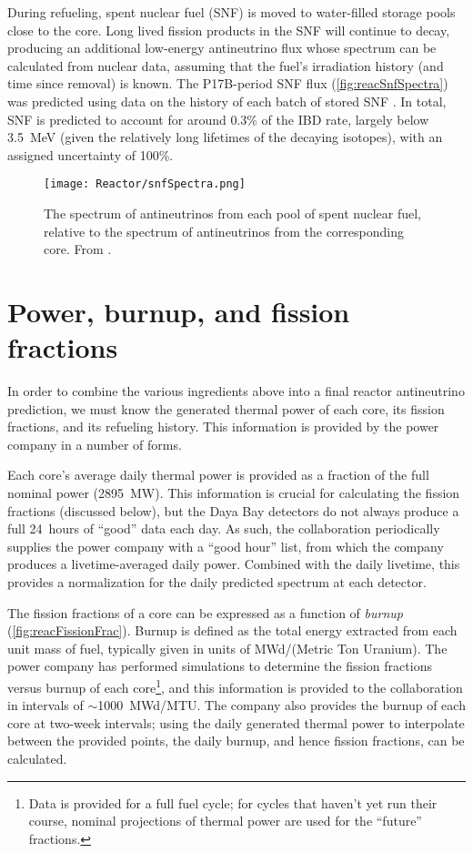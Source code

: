 \documentclass[../thesis.tex]{subfiles}
\begin{document}
During refueling, spent nuclear fuel (SNF) is moved to water-filled storage pools close to the core. Long lived fission products in the SNF will continue to decay, producing an additional low-energy antineutrino flux whose spectrum can be calculated from nuclear data, assuming that the fuel's irradiation history (and time since removal) is known. The P17B-period SNF flux (\autoref{fig:reacSnfSpectra}) was predicted using data on the history of each batch of stored SNF \cite{p17bSnf}. In total, SNF is predicted to account for around 0.3\% of the IBD rate, largely below 3.5~MeV (given the relatively long lifetimes of the decaying isotopes), with an assigned uncertainty of 100\%.

\begin{figure}[ht]
  \texttt{[image: Reactor/snfSpectra.png]}
  \caption{The spectrum of antineutrinos from each pool of spent nuclear fuel, relative to the spectrum of antineutrinos from the corresponding core. From \cite{p17bSnf}.}
    \label{fig:reacSnfSpectra}
\end{figure}

\section{Power, burnup, and fission fractions}
\label{sec:reacpow}

In order to combine the various ingredients above into a final reactor antineutrino prediction, we must know the generated thermal power of each core, its fission fractions, and its refueling history. This information is provided by the power company in a number of forms.

Each core's average daily thermal power is provided as a fraction of the full nominal power (2895~MW). This information is crucial for calculating the fission fractions (discussed below), but the Daya Bay detectors do not always produce a full 24~hours of ``good'' data each day. As such, the collaboration periodically supplies the power company with a ``good hour'' list, from which the company produces a livetime-averaged daily power. Combined with the daily livetime, this provides a normalization for the daily predicted spectrum at each detector.

The fission fractions of a core can be expressed as a function of \emph{burnup} (\autoref{fig:reacFissionFrac}). Burnup is defined as the total energy extracted from each unit mass of fuel, typically given in units of MWd/(Metric Ton Uranium). The power company has performed simulations to determine the fission fractions versus burnup of each core\footnote{Data is provided for a full fuel cycle; for cycles that haven't yet run their course, nominal projections of thermal power are used for the ``future'' fractions.}, and this information is provided to the collaboration in intervals of $\sim$1000~MWd/MTU. The company also provides the burnup of each core at two-week intervals; using the daily generated thermal power to interpolate between the provided points, the daily burnup, and hence fission fractions, can be calculated.
\end{document}
